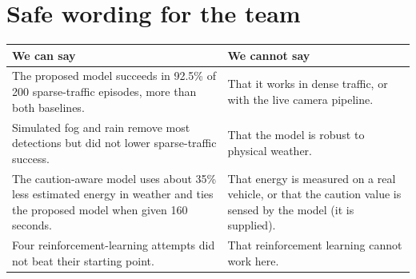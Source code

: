\documentclass[11pt,a4paper]{article}
\begin{document}
\section{Safe wording for the team}
\begin{table}[H]\centering\small
\begin{tabularx}{\textwidth}{@{}>{\raggedright\arraybackslash}p{6.2cm}X@{}}\toprule
We can say & We cannot say\\\midrule
The proposed model succeeds in 92.5\% of 200 sparse-traffic episodes, more than both baselines. & That it works in dense traffic, or with the live camera pipeline.\\
Simulated fog and rain remove most detections but did not lower sparse-traffic success. & That the model is robust to physical weather.\\
The caution-aware model uses about 35\% less estimated energy in weather and ties the proposed model when given 160 seconds. & That energy is measured on a real vehicle, or that the caution value is sensed by the model (it is supplied).\\
Four reinforcement-learning attempts did not beat their starting point. & That reinforcement learning cannot work here.\\\bottomrule
\end{tabularx}
\end{table}
\end{document}

